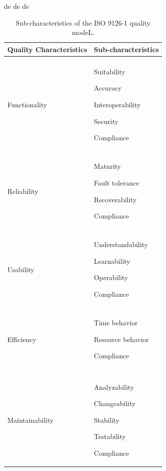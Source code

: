 de
de
de

\begin{table}[h!]
    \caption{Sub-characteristics of the ISO 9126-1 quality modeL.}
	\begin{tabularx}{\textwidth}{X | X }
	    \textbf{Quality Characteristics} & \textbf{Sub-characteristics}	
	    \\ \hline
		\\ %
		Functionality
        & Suitability
        
        Accuracy
        
        Interoperability 
        
        Security
        
        Compliance			 
		
		\\ \hline
	     \\ %
		Reliability    
        
        &  Maturity 
        
        Fault tolerance 
        
        Recoverability 
        
        Compliance
		
		\\ \hline
	     \\ %
	    Usability       
        
        & Understandability 
        
        Learnability 
        
        Operability 
        
        Compliance
    
	    \\ \hline
	  \\ %
	   Efficiency &  Time behavior 
        
        Resource behavior 
        
        Compliance    
        \\ %
	    \\ \hline
	    \\ %
	    
	   Maintainability	
       
       & Analyzability 
        
        Changeability 
        
        Stability 
        
        Testability 
        
        Compliance
        

\end{tabularx}
\end{table}
